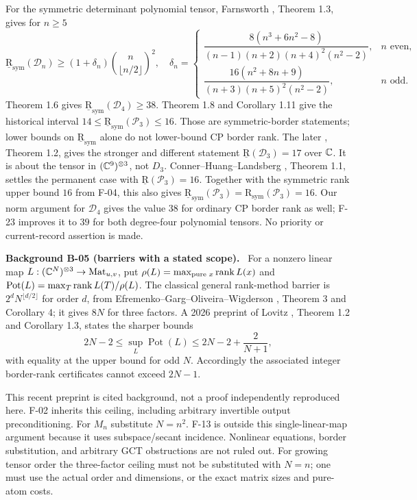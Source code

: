 \documentclass[11pt]{article}
\newcommand{\BR}{\underline{\mathrm R}}\newcommand{\TR}{\mathrm R}
\newcommand{\SR}{\mathrm R_{\mathrm{sym}}}
\newcommand{\BSR}{\underline{\mathrm R}_{\mathrm{sym}}}
\newenvironment{background}[2]{\par\medskip\noindent\textbf{Background #1 (#2).}\ }{\par\medskip}
\begin{document}
For the symmetric determinant polynomial tensor, Farnsworth
\cite{Farn}, Theorem 1.3, gives for $n\geq5$
\[
 \BSR(\mathcal D_n)\geq(1+\delta_n)
                   \binom n{\lfloor n/2\rfloor}^{\!2},
\quad
\delta_n=
\begin{cases}
\dfrac{8(n^3+6n^2-8)}{(n-1)(n+2)(n+4)^2(n^2-2)},&n\text{ even},\\[5pt]
\dfrac{16(n^2+8n+9)}{(n+3)(n+5)^2(n^2-2)},&n\text{ odd}.
\end{cases}
\]
Theorem 1.6 gives $\BSR(\mathcal D_4)\geq38$.
Theorem 1.8 and Corollary 1.11 give the historical interval
$14\leq\BSR(\mathcal P_3)\leq16$.
Those are symmetric-border statements; lower bounds on $\BSR$
alone do not lower-bound CP border rank.
The later \cite{CHL}, Theorem 1.2, gives the stronger and different
statement $\BR(\mathcal D_3)=17$ over $\mathbb C$.
It is about the tensor in $(\mathbb C^9)^{\otimes3}$, not $D_3$.
Conner--Huang--Landsberg \cite{CHuangL}, Theorem 1.1,
settles the permanent case with $\BR(\mathcal P_3)=16$.
Together with the symmetric rank upper bound $16$ from F-04,
this also gives $\BSR(\mathcal P_3)=\SR(\mathcal P_3)=16$.
Our norm argument for $\mathcal D_4$ gives the value $38$ for
ordinary CP border rank as well; F-23 improves it to $39$
for both degree-four polynomial tensors. No priority or
current-record assertion is made.

\begin{background}{B-05}{barriers with a stated scope}
For a nonzero linear map $L:(\mathbb C^N)^{\otimes3}\to\operatorname{Mat}_{u,v}$,
put $\rho(L)=\max_{\text{pure }x}\operatorname{rank} L(x)$ and
$\operatorname{Pot}(L)=\max_T\operatorname{rank} L(T)/\rho(L)$.
The classical general rank-method barrier is
$2^dN^{\lfloor d/2\rfloor}$ for order $d$, from
Efremenko--Garg--Oliveira--Wigderson \cite{EGOW},
Theorem 3 and Corollary 4; it gives $8N$ for three factors.
A 2026 preprint of Lovitz \cite{Lov}, Theorem 1.2 and Corollary 1.3,
states the sharper bounds
\[
 2N-2\leq\sup_L\operatorname{Pot}(L)
       \leq2N-2+\frac2{N+1},
\]
with equality at the upper bound for odd $N$.
Accordingly the associated integer border-rank certificates cannot
exceed $2N-1$.
\end{background}
This recent preprint is cited background, not a proof independently
reproduced here. F-02 inherits this ceiling, including arbitrary
invertible output preconditioning. For $M_n$ substitute $N=n^2$.
F-13 is outside this single-linear-map argument because it uses
subspace/secant incidence. Nonlinear equations, border substitution,
and arbitrary GCT obstructions are not ruled out.
For growing tensor order the three-factor ceiling must not be
substituted with $N=n$; one must use the actual order and dimensions,
or the exact matrix sizes and pure-atom costs.
\end{document}
